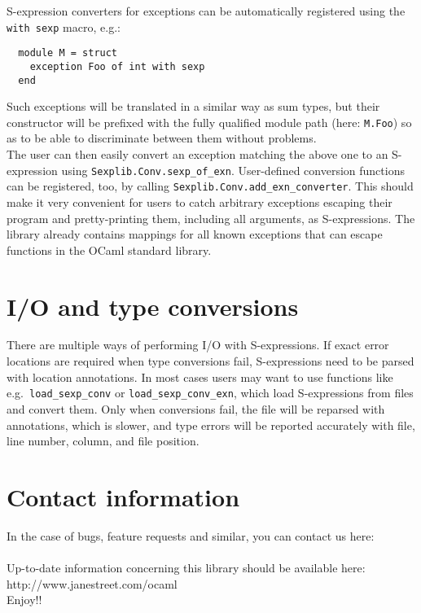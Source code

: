 \documentclass[a4paper]{article}
\makeatletter
\newcommand{\mail}{\mailto{opensource@janestreet.com}}
\newcommand{\homeurl}{http://www.janestreet.com}
\makeatother
\begin{document}
S-expression converters for exceptions can be automatically registered
using the \verb=with sexp= macro, e.g.:

\begin{verbatim}
  module M = struct
    exception Foo of int with sexp
  end
\end{verbatim}

Such exceptions will be translated in a similar way as sum types, but
their constructor will be prefixed with the fully qualified module path
(here: \verb=M.Foo=) so as to be able to discriminate between them
without problems.\\

The user can then easily convert an exception matching the above
one to an S-expression using \verb=Sexplib.Conv.sexp_of_exn=.
User-defined conversion functions can be registered, too, by calling
\verb=Sexplib.Conv.add_exn_converter=.  This should make it very
convenient for users to catch arbitrary exceptions escaping their program
and pretty-printing them, including all arguments, as S-expressions.
The library already contains mappings for all known exceptions that can
escape functions in the OCaml standard library.

\section{I/O and type conversions}

There are multiple ways of performing I/O with S-expressions.  If exact
error locations are required when type conversions fail, S-expressions need
to be parsed with location annotations.  In most cases users may want to use
functions like e.g.\ \verb=load_sexp_conv= or \verb=load_sexp_conv_exn=, which
load S-expressions from files and convert them.  Only when conversions fail,
the file will be reparsed with annotations, which is slower, and type errors
will be reported accurately with file, line number, column, and file position.

\section{Contact information}

\noindent In the case of bugs, feature requests and similar, you can
contact us here:\\

\hspace{2ex}\mail\\

\noindent Up-to-date information concerning this library should be
available here:\\

\hspace{2ex}\homeurl/ocaml\\

Enjoy!!\\
\end{document}
